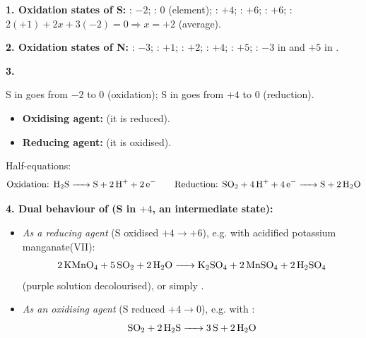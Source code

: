 \documentclass[11pt]{article}
\begin{document}
\begin{corrige}
\textbf{1. Oxidation states of S:} : $-2$; : $0$ (element); : $+4$; : $+6$; : $+6$; : $2(+1) + 2x + 3(-2) = 0 \Rightarrow x = +2$ (average).

\textbf{2. Oxidation states of N:} : $-3$; : $+1$; : $+2$; : $+4$; : $+5$; : $-3$ in  and $+5$ in .

\textbf{3.} 

S in  goes from $-2$ to $0$ (oxidation); S in  goes from $+4$ to $0$ (reduction).
\begin{itemize}
\item \textbf{Oxidising agent:}  (it is reduced).
\item \textbf{Reducing agent:}  (it is oxidised).
\end{itemize}
Half-equations:
\[ \text{Oxidation: } \ce{H2S -> S + 2H+ + 2e-} \qquad \text{Reduction: } \ce{SO2 + 4H+ + 4e- -> S + 2H2O} \]

\textbf{4. Dual behaviour of  (S in $+4$, an intermediate state):}
\begin{itemize}
\item \emph{As a reducing agent} (S oxidised $+4 \rightarrow +6$), e.g. with acidified potassium manganate(VII):
\[ \ce{2KMnO4 + 5SO2 + 2H2O -> K2SO4 + 2MnSO4 + 2H2SO4} \]
(purple solution decolourised), or simply .
\item \emph{As an oxidising agent} (S reduced $+4 \rightarrow 0$), e.g. with :
\[ \ce{SO2 + 2H2S -> 3S + 2H2O} \]
\end{itemize}
\end{corrige}
\end{document}
